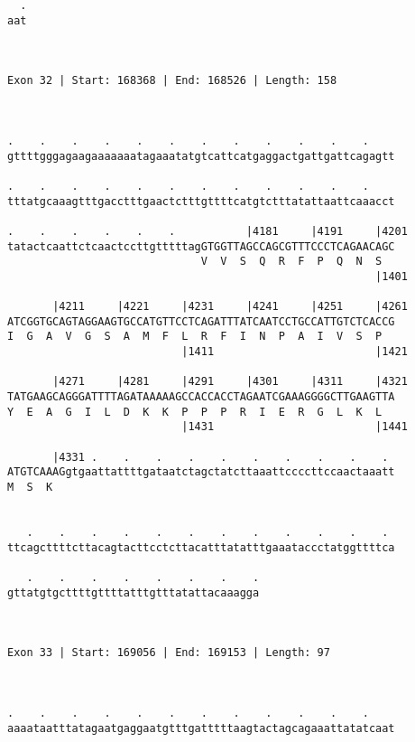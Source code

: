 \documentclass{article}
\begin{document}
\begin{Verbatim}
  .
aat
   
   
 
Exon 32 | Start: 168368 | End: 168526 | Length: 158



.    .    .    .    .    .    .    .    .    .    .    .    
gttttgggagaagaaaaaaatagaaatatgtcattcatgaggactgattgattcagagtt
                                                            
.    .    .    .    .    .    .    .    .    .    .    .    
tttatgcaaagtttgacctttgaactctttgttttcatgtctttatattaattcaaacct
                                                            
.    .    .    .    .    .           |4181     |4191     |4201
tatactcaattctcaactccttgtttttagGTGGTTAGCCAGCGTTTCCCTCAGAACAGC
                              V  V  S  Q  R  F  P  Q  N  S  
                                                         |1401
  
       |4211     |4221     |4231     |4241     |4251     |4261
ATCGGTGCAGTAGGAAGTGCCATGTTCCTCAGATTTATCAATCCTGCCATTGTCTCACCG
I  G  A  V  G  S  A  M  F  L  R  F  I  N  P  A  I  V  S  P  
                           |1411                         |1421
  
       |4271     |4281     |4291     |4301     |4311     |4321
TATGAAGCAGGGATTTTAGATAAAAAGCCACCACCTAGAATCGAAAGGGGCTTGAAGTTA
Y  E  A  G  I  L  D  K  K  P  P  P  R  I  E  R  G  L  K  L  
                           |1431                         |1441
  
       |4331 .    .    .    .    .    .    .    .    .    . 
ATGTCAAAGgtgaattattttgataatctagctatcttaaattccccttccaactaaatt
M  S  K                                                     
                                                            
  
   .    .    .    .    .    .    .    .    .    .    .    . 
ttcagcttttcttacagtacttcctcttacatttatatttgaaataccctatggttttca
                                                            
   .    .    .    .    .    .    .    .
gttatgtgcttttgttttatttgtttatattacaaagga
                                       
                                       
 
Exon 33 | Start: 169056 | End: 169153 | Length: 97



.    .    .    .    .    .    .    .    .    .    .    .    
aaaataatttatagaatgaggaatgtttgatttttaagtactagcagaaattatatcaat
                                                            

\end{Verbatim}
\end{document}
